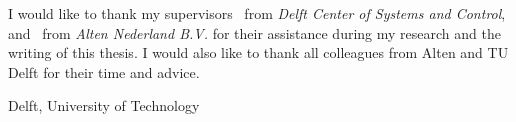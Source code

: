 \documentclass[a4paper,11pt]{mscThesis}
\begin{document}
%
\frontmatter %
%
\maketitle
%

%
    I would like to thank my supervisors \mscreaderone\ from \textit{Delft Center of Systems and Control}, and \mscreaderfour\ from \textit{Alten Nederland B.V.} for their assistance during my research and the writing of this thesis. I would also like to thank all colleagues from Alten and TU Delft for their time and advice.
    \vspace*{15mm}

    \noindent
    Delft, University of Technology \hfill \mscname\\
    \mscdate

%
    \tocloflot
%
    
    \cleardoublepage%
%
%
\mainmatter
%
%
%





%



%

%


	
\appendix



\backmatter
	
	
	
	
	
	\printindex

	\printnomenclature[2 cm]




\end{document}
